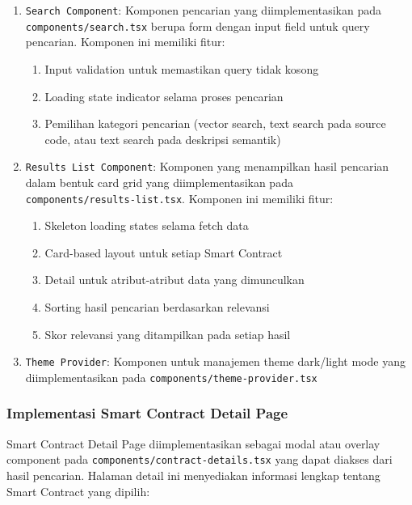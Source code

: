 \begin{enumerate}
	\item \texttt{Search Component}: Komponen pencarian yang diimplementasikan pada \texttt{components/search.tsx} berupa form dengan input field untuk query pencarian. Komponen ini memiliki fitur:
	      \begin{enumerate}
		      \item Input validation untuk memastikan query tidak kosong
		      \item Loading state indicator selama proses pencarian
		      \item Pemilihan kategori pencarian (vector search, text search pada source code, atau text search pada deskripsi semantik)
	      \end{enumerate}
	\item \texttt{Results List Component}: Komponen yang menampilkan hasil pencarian dalam bentuk card grid yang diimplementasikan pada \\\texttt{components/results-list.tsx}. Komponen ini memiliki fitur:
	      \begin{enumerate}
		      \item Skeleton loading states selama fetch data
		      \item Card-based layout untuk setiap Smart Contract
		      \item Detail untuk atribut-atribut data yang dimunculkan
		      \item Sorting hasil pencarian berdasarkan relevansi
		      \item Skor relevansi yang ditampilkan pada setiap hasil
	      \end{enumerate}
	\item \texttt{Theme Provider}: Komponen untuk manajemen theme dark/light mode yang diimplementasikan pada \texttt{components/theme-provider.tsx}
\end{enumerate}

\subsubsection{Implementasi Smart Contract Detail Page}

Smart Contract Detail Page diimplementasikan sebagai modal atau overlay component pada \texttt{components/contract-details.tsx} yang dapat diakses dari hasil pencarian. Halaman detail ini menyediakan informasi lengkap tentang Smart Contract yang dipilih:

